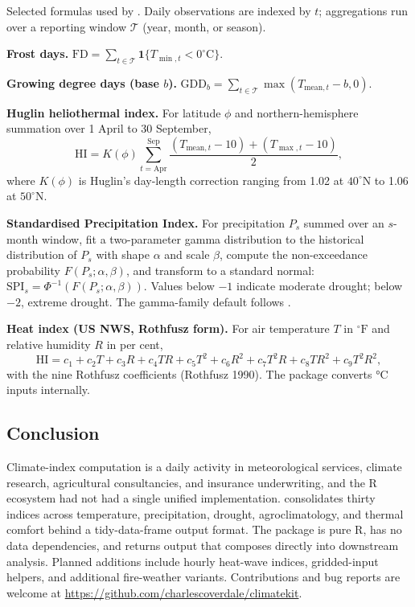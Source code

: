 Selected formulas used by . Daily observations are
indexed by \(t\); aggregations run over a reporting window
\(\mathcal{T}\) (year, month, or season).

\textbf{Frost days.}
\(\mathrm{FD} = \sum_{t \in \mathcal{T}} \mathbf{1}\{T_{\min,t} < 0^\circ\mathrm{C}\}\).

\textbf{Growing degree days (base \(b\)).}
\(\mathrm{GDD}_b = \sum_{t \in \mathcal{T}} \max(T_{\mathrm{mean},t} - b, 0)\).

\textbf{Huglin heliothermal index.} For latitude \(\phi\) and
northern-hemisphere summation over 1 April to 30 September,
\[\mathrm{HI} = K(\phi) \sum_{t = \mathrm{Apr}}^{\mathrm{Sep}}
  \frac{(T_{\mathrm{mean},t} - 10) + (T_{\max,t} - 10)}{2},\] where
\(K(\phi)\) is Huglin's day-length correction ranging from 1.02 at
\(40^\circ\)N to 1.06 at \(50^\circ\)N.

\textbf{Standardised Precipitation Index.} For precipitation \(P_s\)
summed over an \(s\)-month window, fit a two-parameter gamma
distribution to the historical distribution of \(P_s\) with shape
\(\alpha\) and scale \(\beta\), compute the non-exceedance probability
\(F(P_s; \alpha, \beta)\), and transform to a standard normal:
\(\mathrm{SPI}_s = \Phi^{-1}(F(P_s; \alpha, \beta))\). Values below
\(-1\) indicate moderate drought; below \(-2\), extreme drought. The
gamma-family default follows \citet{stagge2015candidate}.

\textbf{Heat index (US NWS, Rothfusz form).} For air temperature \(T\)
in \(^\circ\mathrm{F}\) and relative humidity \(R\) in per cent,
\[\mathrm{HI} = c_1 + c_2 T + c_3 R + c_4 TR
  + c_5 T^2 + c_6 R^2 + c_7 T^2 R + c_8 T R^2 + c_9 T^2 R^2,\] with the
nine Rothfusz coefficients (Rothfusz 1990). The package converts °C
inputs internally.

\subsection{Conclusion}\label{conclusion}

Climate-index computation is a daily activity in meteorological
services, climate research, agricultural consultancies, and insurance
underwriting, and the R ecosystem had not had a single unified
implementation.  consolidates thirty indices across
temperature, precipitation, drought, agroclimatology, and thermal
comfort behind a tidy-data-frame output format. The package is pure R,
has no data dependencies, and returns output that composes directly into
downstream analysis. Planned additions include hourly heat-wave indices,
gridded-input helpers, and additional fire-weather variants.
Contributions and bug reports are welcome at
\url{https://github.com/charlescoverdale/climatekit}.

